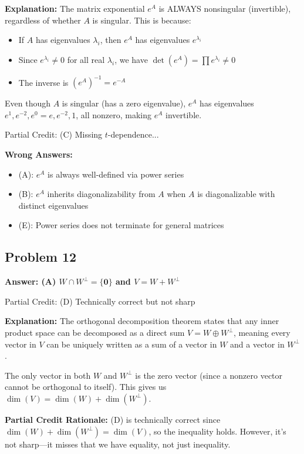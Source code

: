 \documentclass[12pt]{amsart}
\newcommand{\correct}[1]{{\color{correctgreen}\textbf{#1}}}
\newcommand{\partcred}[1]{{\color{partialblue}#1}}
\begin{document}
{\textbf{Explanation:} The matrix exponential $e^A$ is ALWAYS nonsingular (invertible), regardless of whether $A$ is singular. This is because:
\begin{itemize}
\item If $A$ has eigenvalues $\lambda_i$, then $e^A$ has eigenvalues $e^{\lambda_i}$
\item Since $e^{\lambda_i} \neq 0$ for all real $\lambda_i$, we have $\det(e^A) = \prod e^{\lambda_i} \neq 0$
\item The inverse is $(e^A)^{-1} = e^{-A}$
\end{itemize}

Even though $A$ is singular (has a zero eigenvalue), $e^A$ has eigenvalues $e^1, e^{-2}, e^0 = e, e^{-2}, 1$, all nonzero, making $e^A$ invertible.

\partcred{Partial Credit: (C) Missing $t$-dependence...}

\textbf{Wrong Answers:}
\begin{itemize}
\item (A): $e^A$ is always well-defined via power series
\item (B): $e^A$ inherits diagonalizability from $A$ when $A$ is diagonalizable with distinct eigenvalues
\item (E): Power series does not terminate for general matrices
\end{itemize}

\subsection*{Problem 12}
\correct{Answer: (A) $W \cap W^{\perp} = \{\mathbf{0}\}$ and $V = W + W^{\perp}$}

\partcred{Partial Credit: (D) Technically correct but not sharp}

\textbf{Explanation:} The orthogonal decomposition theorem states that any inner product space can be decomposed as a direct sum $V = W \oplus W^{\perp}$, meaning every vector in $V$ can be uniquely written as a sum of a vector in $W$ and a vector in $W^{\perp}$. 

The only vector in both $W$ and $W^{\perp}$ is the zero vector (since a nonzero vector cannot be orthogonal to itself). This gives us $\dim(V) = \dim(W) + \dim(W^{\perp})$.

\textbf{Partial Credit Rationale:} (D) is technically correct since $\dim(W) + \dim(W^{\perp}) = \dim(V)$, so the inequality holds. However, it's not sharp—it misses that we have equality, not just inequality.

}
\end{document}
